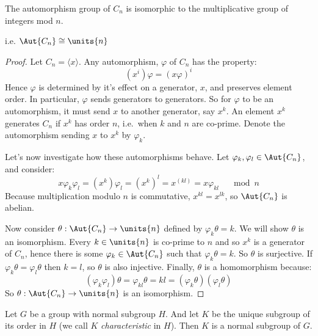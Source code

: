 \begin{lemma}\label{lem:aut}
    The automorphism group of \(C_n\) is isomorphic to the multiplicative group
    of integers mod \(n\).

    i.e. \(\Aut{C_n} \cong \units{n}\)
\end{lemma}

\begin{proof}
    Let \(C_n = \langle x \rangle\).
    Any automorphism, \(\varphi\) of \(C_n\) has the property:
    \[(x^i)\varphi = {(x\varphi)}^i\]
    Hence \(\varphi\) is determined by it's effect on a generator, \(x\), and preserves element
    order.
    In particular, \(\varphi\) sends generators to generators.
    So for \(\varphi\) to be an automorphism, it must send \(x\) to another generator, say \(x^k\).
    An element \(x^k\) generates \(C_n\) if \(x^k\) has order \(n\), i.e.\ when \(k\) and \(n\) are co-prime.
    Denote the automorphism sending \(x\) to \(x^k\) by \(\varphi_k\).

    Let's now investigate how these automorphisms behave.
    Let \(\varphi_k, \varphi_l \in \Aut{C_n}\), and consider:
    \[x\varphi_k\varphi_l = (x^k)\varphi_l = {(x^k)}^l = x^{(kl)} = x\varphi_{kl} \quad \mod{n}\]
    Because multiplication modulo \(n\) is commutative, \(x^{kl} = x^{lk}\), so \(\Aut{C_n}\) is abelian.

    Now consider \(\theta:\Aut{C_n} \to \units{n}\) defined by \(\varphi_k\theta = k\).
    We will show \(\theta\) is an isomorphism.
    Every \(k \in \units{n}\) is co-prime to \(n\) and so \(x^k\) is a generator of \(C_n\), hence there is some \(\varphi_k
    \in \Aut{C_n}\) such that \(\varphi_k\theta = k\).
    So \(\theta\) is surjective.
    If \(\varphi_k\theta = \varphi_l\theta\) then \(k = l\), so \(\theta\) is also injective.
    Finally, \(\theta\) is a homomorphism because:
    \[(\varphi_k\varphi_l)\theta = \varphi_{kl}\theta = kl = (\varphi_k\theta)(\varphi_l\theta)\]
    So \(\theta:\Aut{C_n} \to \units{n}\) is an isomorphism.
\end{proof}

\begin{lemma}\label{lem:char}
    Let \(G\) be a group with normal subgroup \(H\).
    And let \(K\) be the unique subgroup of its order in \(H\) (we call \(K\) \emph{characteristic} in \(H\)).
    Then \(K\) is a normal subgroup of \(G\).
\end{lemma}

